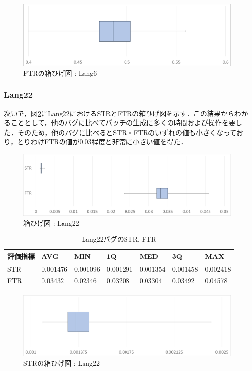 \documentclass[uplatex,dvipdfmx,a4paper]{jsarticle}
\begin{document}
\begin{figure}[t]
  \centering
  \includegraphics[width=\linewidth]{fig/Lang6_boxplot_FTR.png}
  \caption{FTRの箱ひげ図 : Lang6}
  \label{fig:Lang6_boxplot_FTR}
\end{figure}
\subsubsection{Lang22}
次いで，図\ref{fig:Lang22_boxplot}にLang22におけるSTRとFTRの箱ひげ図を示す．この結果からわかることとして，他のバグに比べてパッチの生成に多くの時間および操作を要した．そのため，他のバグに比べるとSTR・FTRのいずれの値も小さくなっており，とりわけFTRの値が0.03程度と非常に小さい値を得た．
\begin{figure}[t]
  \centering
  \includegraphics[width=\linewidth]{fig/Lang22_boxplot.png}
  \caption{箱ひげ図 : Lang22}
  \label{fig:Lang22_boxplot}
\end{figure}
\begin{table}[b]
  \centering
  \caption{Lang22バグのSTR, FTR}
  \label{tab:Lang22}
  \begin{tabular}{l|llllll} \hline\hline
    評価指標 & AVG         & MIN & 1Q & MED & 3Q & MAX   \\\hline
    STR & 0.001476 & 0.001096 & 0.001291 & 0.001354 & 0.001458 & 0.002418  \\
    FTR & 0.03432 & 0.02346 & 0.03208 & 0.03304 & 0.03492 & 0.04578 \\\hline\hline
  \end{tabular}
\end{table}
\begin{figure}[t]
  \centering
  \includegraphics[width=\linewidth]{fig/Lang22_boxplot_STR.png}
  \caption{STRの箱ひげ図 : Lang22}
  \label{fig:Lang22_boxplot_STR}
\end{figure}
\end{document}
